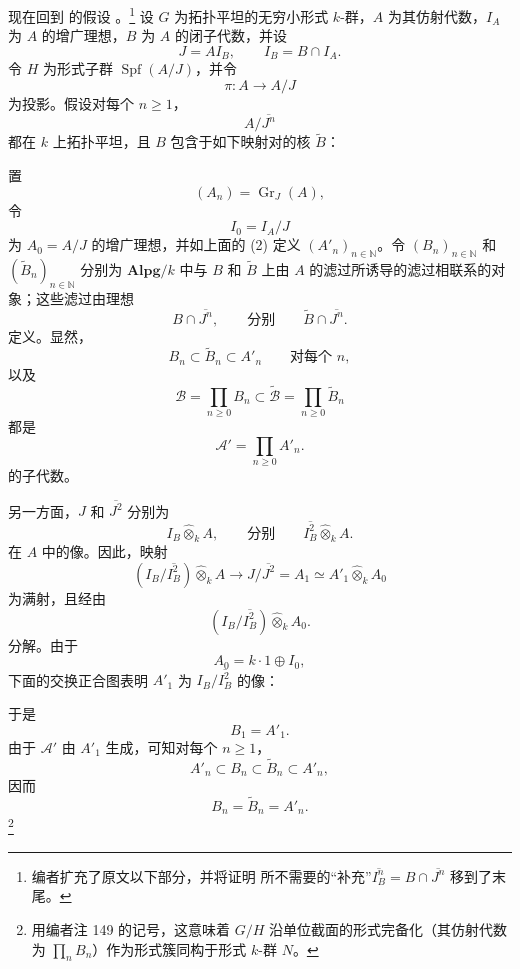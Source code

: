 
现在回到  的假设 \textup{}。\footnote{%
\label{sga3:VIIB:nde:150}编者扩充了原文以下部分，并将证明  所不需要的“补充”\(\overline{I_B^n}=B\cap\overline{J^n}\) 移到了末尾。}
设 \(G\) 为拓扑平坦的无穷小形式 \(k\)-群，\(A\) 为其仿射代数，\(I_A\) 为 \(A\) 的增广理想，\(B\) 为 \(A\) 的闭子代数，并设
\[
  J=AI_B,
  \qquad
  I_B=B\cap I_A.
\]
令 \(H\) 为形式子群 \(\operatorname{Spf}(A/J)\)，并令
\[
  \pi:A\longrightarrow A/J
\]
为投影。假设对每个 \(n\geq1\)，
\[
  A/\overline{J^n}
\]
都在 \(k\) 上拓扑平坦，且 \(B\) 包含于如下映射对的核 \(\widetilde B\)：
\begin{center}
  \label{sga3:VIIB:5.1.4:quotient-kernel-pair}
  
\end{center}

置
\[
  (A_n)=\operatorname{Gr}_J(A),
\]
令
\[
  I_0=I_A/J
\]
为 \(A_0=A/J\) 的增广理想，并如上面的 \textup{(2)} 定义 \((A'_n)_{n\in\mathbb N}\)。令 \((B_n)_{n\in\mathbb N}\) 和 \((\widetilde B_n)_{n\in\mathbb N}\) 分别为 \(\mathbf{Alpg}/k\) 中与 \(B\) 和 \(\widetilde B\) 上由 \(A\) 的滤过所诱导的滤过相联系的对象；这些滤过由理想
\[
  B\cap\overline{J^n},
  \qquad\text{分别}\qquad
  \widetilde B\cap\overline{J^n}.
\]
定义。显然，
\[
  B_n\subset\widetilde B_n\subset A'_n
  \qquad\text{对每个 }n,
\]
以及
\[
  \mathscr B=\prod_{n\geq0}B_n
  \subset
  \widetilde{\mathscr B}
  =
  \prod_{n\geq0}\widetilde B_n
\]
都是
\[
  \mathscr A'=\prod_{n\geq0}A'_n.
\]
的子代数。

另一方面，\(J\) 和 \(\overline{J^2}\) 分别为
\[
  I_B\widehat\otimes_kA,
  \qquad\text{分别}\qquad
  \overline{I_B^2}\widehat\otimes_kA.
\]
在 \(A\) 中的像。因此，映射
\[
  (I_B/\overline{I_B^2})\widehat\otimes_kA
  \longrightarrow
  J/\overline{J^2}
  =
  A_1
  \simeq
  A'_1\widehat\otimes_kA_0
\]
为满射，且经由
\[
  (I_B/\overline{I_B^2})\widehat\otimes_kA_0.
\]
分解。由于
\[
  A_0=k\cdot1\oplus I_0,
\]
下面的交换正合图表明 \(A'_1\) 为 \(I_B/\overline{I_B^2}\) 的像：
\begin{center}
  \label{sga3:VIIB:5.1.4:degree-one-image-diagram}
  
\end{center}
于是
\[
  B_1=A'_1.
\]
由于 \(\mathscr A'\) 由 \(A'_1\) 生成，可知对每个 \(n\geq1\)，
\[
  A'_n\subset B_n\subset\widetilde B_n\subset A'_n,
\]
因而
\[
  B_n=\widetilde B_n=A'_n.
\]
\footnote{\label{sga3:VIIB:nde:151}用编者注 149 的记号，这意味着 \(G/H\) 沿单位截面的形式完备化（其仿射代数为 \(\prod_nB_n\)）作为形式簇同构于形式 \(k\)-群 \(N\)。}

